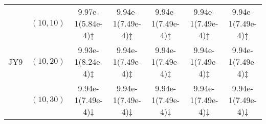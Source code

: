 \documentclass[review]{elsarticle}
\begin{document}
\begin{table*}[!htb]
{\begin{tabular}{ccccccc}
\hline  \multirow{3}{*}{JY9}
&$(10,10)$ &9.97e-1(5.84e-4)$\ddagger$ &9.94e-1(7.49e-4)$\ddagger$ &9.94e-1(7.49e-4)$\ddagger$ &9.94e-1(7.49e-4)$\ddagger$ &9.94e-1(7.49e-4)$\ddagger$ \\
&$(10,20)$ &9.93e-1(8.24e-4)$\ddagger$ &9.94e-1(7.49e-4)$\ddagger$ &9.94e-1(7.49e-4)$\ddagger$ &9.94e-1(7.49e-4)$\ddagger$ &9.94e-1(7.49e-4)$\ddagger$ \\
&$(10,30)$ &9.94e-1(7.49e-4)$\ddagger$ &9.94e-1(7.49e-4)$\ddagger$ &9.94e-1(7.49e-4)$\ddagger$ &9.94e-1(7.49e-4)$\ddagger$ &9.94e-1(7.49e-4)$\ddagger$ \\
\hline
\end{tabular}}
 
 
 
\end{table*}
\end{document}
